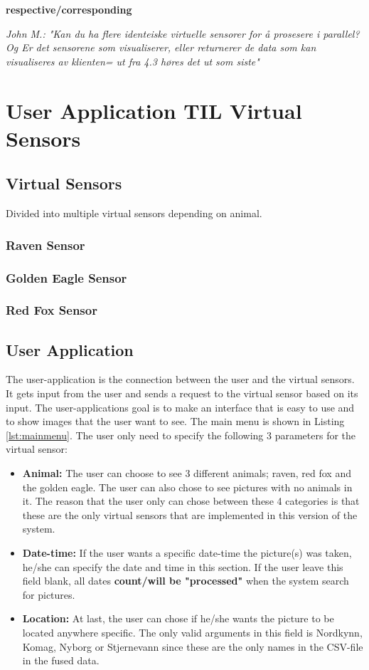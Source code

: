 \documentclass[USenglish]{uit-thesis}
\begin{document}
\textbf{respective/corresponding}

\textit{John M.: "Kan du ha flere identeiske virtuelle sensorer for å prosesere i parallel? Og Er det sensorene som visualiserer, eller returnerer de data som kan  visualiseres av klienten= ut fra 4.3 høres det ut som siste"}

\section{User Application TIL Virtual Sensors}

\subsection{Virtual Sensors}
Divided into multiple virtual sensors depending on animal.
\subsubsection{Raven Sensor}
\subsubsection{Golden Eagle Sensor}
\subsubsection{Red Fox Sensor}

\subsection{User Application}
The user-application is the connection between the user and the virtual sensors. It gets input from the user and sends a request to the virtual sensor based on its input. The user-applications goal is to make an interface that is easy to use and to show images that the user want to see. The main menu is shown in Listing \ref{lst:mainmenu}.
The user only need to specify the following 3 parameters for the virtual sensor:

\begin{itemize}
\item \textbf{Animal:} The user can choose to see 3 different animals; raven, red fox and the golden eagle. The user can also chose to see pictures with no animals in it. The reason that the user only can chose between these 4 categories is that these are the only virtual sensors that are implemented in this version of the system.

\item \textbf{Date-time:} If the user wants a specific date-time the picture(s) was taken, he/she can specify the date and time in this section. If the user leave this field blank, all dates \textbf{count/will be "processed"} when the system search for pictures.

\item \textbf{Location:} At last, the user can chose if he/she wants the picture to be located anywhere specific. The only valid arguments in this field is Nordkynn, Komag, Nyborg or Stjernevann since these are the only names in the CSV-file in the fused data.
\end{itemize}
\end{document}
